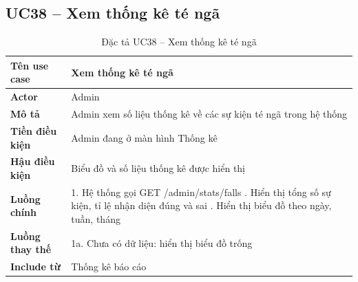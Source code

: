 \subsection*{UC38 -- Xem thống kê té ngã}
\begin{table}[H]
    \captionsetup{justification=raggedright, singlelinecheck=false}
    \caption{Đặc tả UC38 -- Xem thống kê té ngã}
\centering
\begin{tabular}{|p{3.5cm}|p{10cm}|}
\hline
\textbf{Tên use case} & Xem thống kê té ngã \\
\hline
\textbf{Actor} & Admin \\
\hline
\textbf{Mô tả} & Admin xem số liệu thống kê về các sự kiện
  té ngã trong hệ thống \\
\hline
\textbf{Tiền điều kiện} & Admin đang ở màn hình Thống kê \\
\hline
\textbf{Hậu điều kiện} & Biểu đồ và số liệu thống kê
  được hiển thị \\
\hline
\textbf{Luồng chính} &
  1. Hệ thống gọi GET /admin/stats/falls \newline
  2. Hiển thị tổng số sự kiện, tỉ lệ nhận diện đúng
     và sai \newline
  3. Hiển thị biểu đồ theo ngày, tuần, tháng \\
\hline
\textbf{Luồng thay thế} &
  1a. Chưa có dữ liệu: hiển thị biểu đồ trống \\
\hline
\textbf{Include từ} & Thống kê báo cáo \\
\hline
\end{tabular}

\end{table}


